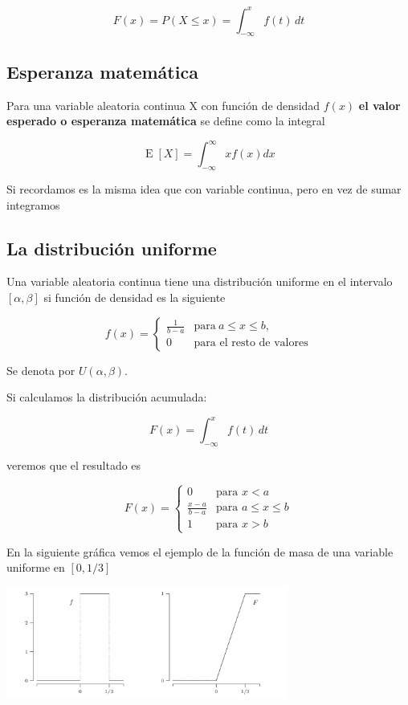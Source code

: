 \documentclass[
]{article}
\begin{document}
\[F(x)=P(X\leq x)=\int _{-\infty }^{x}f(t)\,dt\]

\hypertarget{esperanza-matemuxe1tica}{%
\subsection{Esperanza matemática}\label{esperanza-matemuxe1tica}}

Para una variable aleatoria continua X con función de densidad
\(\displaystyle f(x)\) \textbf{el valor esperado o esperanza matemática}
se define como la integral

\[\displaystyle \operatorname {E} [X]=\int^{\infty}_{-\infty }xf(x)dx\]

Si recordamos es la misma idea que con variable continua, pero en vez de
sumar integramos

\hypertarget{la-distribuciuxf3n-uniforme}{%
\subsection{La distribución
uniforme}\label{la-distribuciuxf3n-uniforme}}

Una variable aleatoria continua tiene una distribución uniforme en el
intervalo \([\alpha, \beta]\) si función de densidad es la siguiente

\[f(x)=\begin{cases}{\frac {1}{b-a}}&\mathrm {para} \ a\leq x\leq b,\\[8pt]0&\text {para el resto de valores}\end{cases}\]

Se denota por \(U(\alpha, \beta)\).

Si calculamos la distribución acumulada:

\[F(x)= \int _{-\infty }^{x}f(t)\,dt\]

veremos que el resultado es

\[\displaystyle F(x)=\begin{cases}0&{\text{para }}x<a\\[8pt]{\frac {x-a}{b-a}}&{\text{para }}a\leq x\leq b\\[8pt]1&{\text{para }}x>b\end{cases}\]

En la siguiente gráfica vemos el ejemplo de la función de masa de una
variable uniforme en \([0,1/3]\)

\includegraphics[width=3.64583in,height=\textheight]{sc_2.png}
\end{document}
